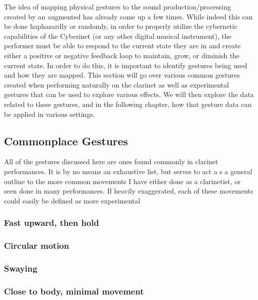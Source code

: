 The idea of mapping physical gestures to the sound production/processing created by an augmented has already come up a few times. While indeed this can be done haphazardly or randomly, in order to properly utilize the cybernetic capabilities of the Cyberinet (or any other digital musical instrument), the performer must be able to respond to the current state they are in and create either a positive or negative feedback loop to maintain, grow, or diminish the current state. In order to do this, it is important to identify gestures being used and how they are mapped. This section will go over various common gestures created when performing naturally on the clarinet as well as experimental gestures that can be used to explore various effects. We will then explore the data related to these gestures, and in the following chapter, how that gesture data can be applied in various settings.

\subsection{Commonplace Gestures}
All of the gestures discussed here are ones found commonly in clarinet performances. It is by no means an exhaustive list, but serves to act a s a general outline to the more common movements I have either done as a clarinetist, or seen done in many performances. If heavily exaggerated, each of these movements could easily be defined as more experimental

\subsubsection{Fast upward, then hold}


\subsubsection{Circular motion}



\subsubsection{Swaying}



\subsubsection{Close to body, minimal movement}



